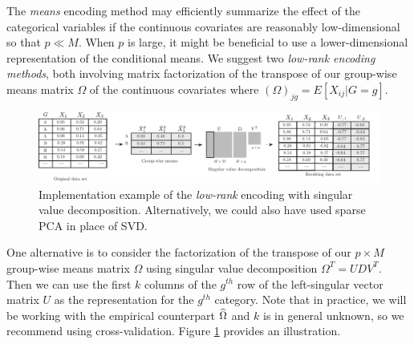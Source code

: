 \documentclass{article}
\theoremstyle{plain}
\theoremstyle{definition}
\theoremstyle{remark}
\begin{document}
The \emph{means} encoding method may efficiently summarize the effect of the categorical variables if the continuous covariates are reasonably low-dimensional so that $p \ll M$. When $p$ is large, it might be beneficial to use a lower-dimensional representation of the conditional means. We suggest two  \emph{low-rank encoding methods}, both involving matrix factorization of the transpose of our group-wise means matrix $\Omega$ of the continuous covariates where $(\Omega)_{jg} = E[X_{ij} | G=g]$.
\begin{figure}[H]
  \centering
  \includegraphics[width=\textwidth]{figures/lowrank_encoding.pdf}
  \caption{Implementation example of the \emph{low-rank} encoding with singular value decomposition. Alternatively, we could also have used sparse PCA in place of SVD.}
  \label{fig:lowrank_encoding}
\end{figure}

One alternative is to consider the factorization of the transpose of our $p \times M$ group-wise means matrix $\Omega$ using singular value decomposition $\Omega^T = U D V^{T}$. Then we can use the first $k$ columns of the $g^{th}$ row of the left-singular vector matrix $U$ as the representation for the $g^{th}$ category. Note that in practice, we will be working with the empirical counterpart $\widehat{\Omega}$ and $k$ is in general unknown, so we recommend using cross-validation. Figure \ref{fig:lowrank_encoding} provides an illustration.
\end{document}
